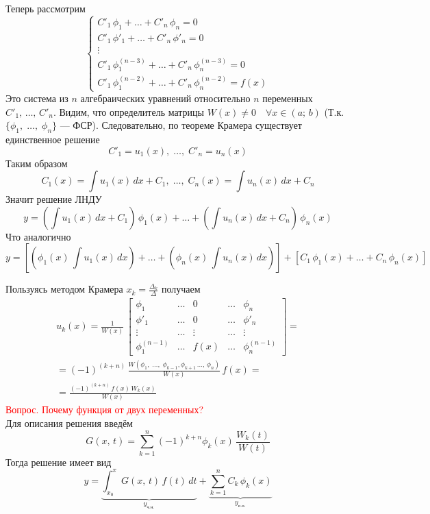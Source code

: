 \begin{Proof}
    Теперь рассмотрим
    \[
        \begin{cases}
            C'_1\,\phi_1 + \dots + C'_n\,\phi_n = 0\\
            C'_1\,\phi'_1 + \dots + C'_n\,\phi'_n = 0\\
            \vdots\\
            C'_1\,\phi^{(n-3)}_1 + \dots + C'_n\,\phi^{(n-3)}_n = 0\\
            C'_1\,\phi^{(n-2)}_1 + \dots + C'_n\,\phi^{(n-2)}_n = f(x)
        \end{cases}
    \]
    Это система из $n$ алгебраических уравнений относительно $n$ переменных $C'_1,\, \dots,\, C'_n$. Видим, что определитель матрицы $W(x) \neq 0 \quad \forall x \in (a;\,b)$ (Т.к. $\{\phi_1,\; \dots,\; \phi_n\}$ --- ФСР). Следовательно, по теореме Крамера существует единственное решение
    \[
        C'_1 = u_1(x),\; \dots,\; C'_n = u_n(x)
    \]
    Таким образом
    \[
        C_1(x) = \int u_1(x)\,dx + C_1,\; \dots,\; C_n(x) = \int u_n(x)\,dx + C_n
    \]
    Значит решение ЛНДУ
    \[
        y = \left(\int u_1(x)\,dx + C_1\right)\,\phi_1(x) + \dots + \left(\int u_n(x)\,dx + C_n\right)\,\phi_n(x)
    \]
    Что аналогично
    \[
        y = \left[\left(\phi_1(x)\, \int u_1(x)\,dx \right) + \dots + \left( \phi_n(x)\, \int u_n(x)\,dx \right) \right] + \left[C_1\,\phi_1(x) + \dots + C_n\,\phi_n(x)\right]
    \]
\end{Proof}

\begin{Note}
    Пользуясь методом Крамера $x_k = \frac{\Delta_k}{\Delta}$ получаем
    \begin{gather*}
        u_k(x) = \frac{1}{W(x)} \, 
        \begin{bmatrix}
            \phi_1 & \dots & 0 & \dots & \phi_n\\
            \phi'_1 & \dots & 0 & \dots & \phi'_n\\
            \vdots & \dots & \vdots & \dots & \vdots\\
            \phi^{(n-1)}_1 & \dots & f(x) & \dots & \phi^{(n-1)}_n
        \end{bmatrix} = \\
        = (-1)^{(k+n)}\, \frac{W(\phi_1,\; \dots,\; \phi_{k - 1}, \phi_{k + 1}\, \dots,\, \phi_n)}{W(x)}\,f(x) = \\
        = \frac{(-1)^{(k+n)}\, f(x)\, W_k(x)}{W(x)}
    \end{gather*}
    \textcolor{red}{Вопрос. Почему функция от двух переменных?}\\
    Для описания решения введём
    \[
        G(x,\, t) = \sum_{k=1}^{n} (-1)^{k + n} \phi_k(x)\, \frac{W_k(t)}{W(t)}
    \]
    Тогда решение имеет вид
    \[
        y = \underbrace{\int_{x_0}^{x}G(x,\,t)\, f(t)\, dt}_{y_\text{ч.н.}} + \underbrace{\sum_{k=1}^{n} C_k\, \phi_k(x)}_{y_\text{о.о.}}
    \]
\end{Note}

